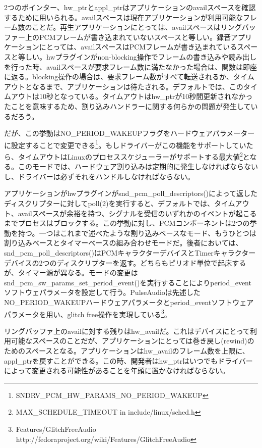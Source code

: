 \documentclass[onecolumn]{jarticle}
\begin{document}
2つのポインター、hw\_ptrとappl\_ptrはアプリケーションのavailスペースを確認するために用いられる。availスペースは現在アプリケーションが利用可能なフレーム数のことだ。再生アプリケーションにとっては、availスペースはリングバッファー上のPCMフレームが書き込まれていないスペースと等しい。録音アプリケーションにとっては、availスペースはPCMフレームが書き込まれているスペースと等しい。hwプラグインがnon-blocking操作でフレームの書き込みや読み出しを行った時、availスペースが要求フレーム数に満たなかった場合は、関数は即座に返る。blocking操作の場合は、要求フレーム数がすべて転送されるか、タイムアウトとなるまで、アプリケーションは待たされる。デフォルトでは、このタイムアウトは10秒となっている。タイムアウトはhw\_ptrが10秒間更新されなかったことを意味するため、割り込みハンドラーに関する何らかの問題が発生しているだろう。

だが、この挙動はNO\_PERIOD\_WAKEUPフラグをハードウェアパラメーターに設定することで変更できる\footnote{SNDRV\_PCM\_HW\_PARAMS\_NO\_PERIOD\_WAKEUP}。もしドライバーがこの機能をサポートしていたら、タイムアウトはLinuxのプロセススケジューラーがサポートする最大値\footnote{MAX\_SCHEDULE\_TIMEOUT in include/linux/sched.h}となる。このモードでは、ハードウェア割り込みは定期的に発生しなければならないし、ドライバーは必ずそれをハンドルしなければならない。

アプリケーションがhwプラグインがsnd\_pcm\_poll\_descriptors()によって返したディスクリプターに対してpoll(2)を実行すると、デフォルトでは、タイムアウト、availスペースが余裕を持つ、シグナルを受信のいずれかのイベントが起こるまでプロセスはブロックする。この挙動に対し、PCMコンポーネントは2つの挙動を持つ。一つはこれまで述べたような割り込みベースなモード、もうひとつは割り込みベースとタイマーベースの組み合わせモードだ。後者においては、snd\_pcm\_poll\_descriptors()はPCMキャラクターデバイスとTimerキャラクターデバイスの2つのディスクリプターを返す。どちらもピリオド単位で起床するが、タイマー源が異なる。モードの変更はsnd\_pcm\_sw\_params\_set\_period\_event()を実行することによりperiod\_eventソフトウェパラメータを設定して行う。PulseAudioは先述したNO\_PERIOD\_WAKEUPハードウェアパラメータとperiod\_eventソフトウェアパラメータを用い、glitch free操作を実現している\footnote{Features/GlitchFreeAudio http://fedoraproject.org/wiki/Features/GlitchFreeAudio}。

リングバッファ上のavailに対する残りはhw\_availだ。これはデバイスにとって利用可能なスペースのことだが、アプリケーションにとっては巻き戻し(rewind)のためのスペースとなる。アプリケーションはhw\_availのフレーム数を上限に、appl\_ptrを戻すことができる。この時、開発者はhw\_ptrはいつでもドライバーによって変更される可能性があることを年頭に置かなければならない。
\end{document}
